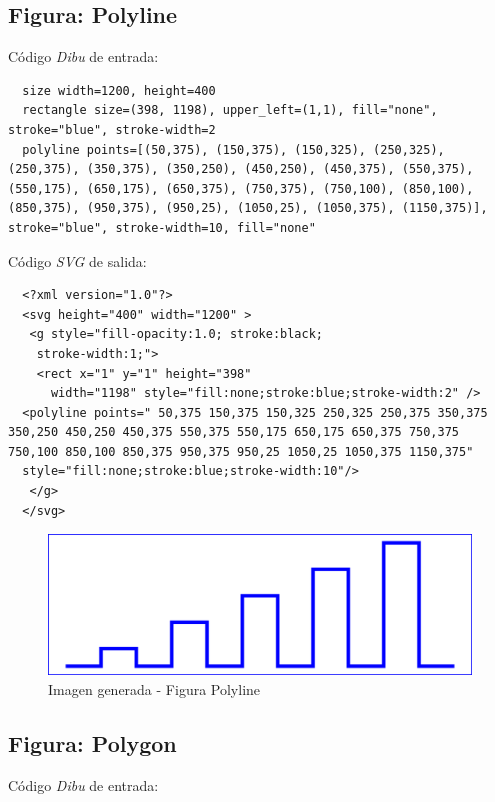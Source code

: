 \subsection{\textbf{Figura:} Polyline}

Código \textit{Dibu} de entrada:

\begin{lstlisting}
  size width=1200, height=400
  rectangle size=(398, 1198), upper_left=(1,1), fill="none", stroke="blue", stroke-width=2
  polyline points=[(50,375), (150,375), (150,325), (250,325), (250,375), (350,375), (350,250), (450,250), (450,375), (550,375), (550,175), (650,175), (650,375), (750,375), (750,100), (850,100), (850,375), (950,375), (950,25), (1050,25), (1050,375), (1150,375)], stroke="blue", stroke-width=10, fill="none"
\end{lstlisting}

Código \textit{SVG} de salida:

\begin{lstlisting}
  <?xml version="1.0"?>
  <svg height="400" width="1200" >
   <g style="fill-opacity:1.0; stroke:black;
    stroke-width:1;">
    <rect x="1" y="1" height="398"
      width="1198" style="fill:none;stroke:blue;stroke-width:2" />
  <polyline points=" 50,375 150,375 150,325 250,325 250,375 350,375 350,250 450,250 450,375 550,375 550,175 650,175 650,375 750,375 750,100 850,100 850,375 950,375 950,25 1050,25 1050,375 1150,375"
  style="fill:none;stroke:blue;stroke-width:10"/>
   </g>
  </svg>
\end{lstlisting}

\begin{figure}[H]
\centering
\includegraphics[width=150mm]{imagenes/polyline.jpg}
\caption{Imagen generada - Figura Polyline}
\end{figure}

\subsection{\textbf{Figura:} Polygon}

Código \textit{Dibu} de entrada:

